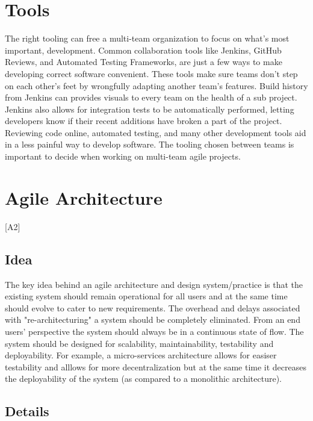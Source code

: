 \documentclass[sigplan,screen]{acmart}
\begin{document}
\section{Tools}
The right tooling can free a multi-team organization to focus on what's most important, development.
Common collaboration tools like Jenkins, GitHub Reviews, and Automated Testing Frameworks, are just a few ways to make developing correct software convenient.
These tools make sure teams don't step on each other's feet by wrongfully adapting another team's features.
Build history from Jenkins can provides visuals to every team on the health of a sub project.
Jenkins also allows for integration tests to be automatically performed, letting developers know if their recent additions have broken a part of the project.
Reviewing code online, automated testing, and many other development tools aid in a less painful way to develop software.
The tooling chosen between teams is important to decide when working on multi-team agile projects.

\section{Agile Architecture} [A2]
\subsection{Idea}
The key idea behind an agile architecture and design system/practice is that the existing system should remain operational for all users and at the same time should evolve to cater to new requirements.
The overhead and delays associated with "re-architecturing" a system should be completely eliminated. From an end users' perspective the system should always be in a continuous state of flow.
The system should be designed for scalability, maintainability, testability and deployability. For example, a micro-services architecture allows for easiser testability and alllows for more decentralization but at the same time it decreases the deployability of the system (as compared to a monolithic architecture).
\subsection{Details}

%


\end{document}
